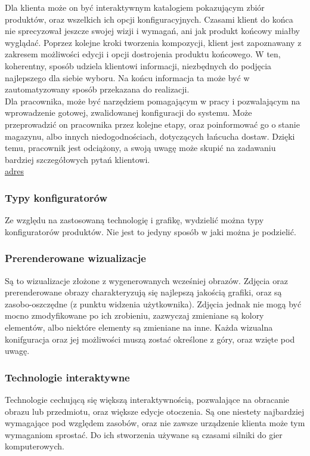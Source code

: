 \documentclass{article} %
\begin{document}
        Dla klienta może on być interaktywnym katalogiem pokazującym zbiór produktów, oraz wszelkich ich opcji konfiguracyjnych. Czasami klient do końca nie sprecyzował jeszcze swojej wizji i wymagań, ani jak produkt końcowy miałby wyglądać. Poprzez kolejne kroki tworzenia kompozycji, klient jest zapoznawany z zakresem możliwości edycji i opcji dostrojenia produktu końcowego. W ten, koherentny, sposób udziela klientowi informacji, niezbędnych do podjęcia najlepszego dla siebie wyboru. Na końcu informacja ta może być w zautomatyzowany sposób przekazana do realizacji.
        \\
        
        Dla pracownika, może być narzędziem pomagającym w pracy i pozwalającym na wprowadzenie gotowej, zwalidowanej konfiguracji do systemu. Może przeprowadzić on pracownika przez kolejne etapy, oraz poinformować go o stanie magazynu, albo innych niedogodnościach, dotyczących łańcucha dostaw. Dzięki temu, pracownik jest odciążony, a swoją uwagę może skupić na zadawaniu bardziej szczegółowych pytań klientowi.
        \\
        \href{https://docs.oracle.com/cd/E16582_01/doc.91/e15086/und_configurator.htm#EOABC00002}{adres}
        \\
        
        \subsubsection{Typy konfiguratorów}
        Ze względu na zastosowaną technologię i grafikę, wydzielić można typy konfiguratorów produktów. Nie jest to jedyny sposób w jaki można je podzielić.
        \\
        
        \subsubsection*{Prerenderowane wizualizacje}
        Są to wizualizacje złożone z wygenerowanych wcześniej obrazów. Zdjęcia oraz prerenderowane obrazy charakteryzują się najlepszą jakością grafiki, oraz są zasobo-oszczędne (z punktu widzenia użytkownika). Zdjęcia jednak nie mogą być mocno zmodyfikowane po ich zrobieniu, zazwyczaj zmieniane są kolory elementów, albo niektóre elementy są zmieniane na inne. Każda wizualna konifguracja oraz jej możliwości muszą zostać określone z góry, oraz wzięte pod uwagę. 
        \\
        
        \subsubsection*{Technologie interaktywne}
        Technologie cechującą się większą interaktywnością, pozwalające na obracanie obrazu lub przedmiotu, oraz większe edycje otoczenia. Są one niestety najbardziej wymagające pod względem zasobów, oraz nie zawsze urządzenie klienta może tym wymaganiom sprostać. Do ich stworzenia używane są czasami silniki do gier komputerowych.
        \\
    
\end{document}
